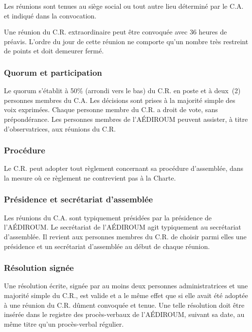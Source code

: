 \documentclass{aediroum}
\begin{document}
Les réunions sont tenues au siège social ou tout autre lieu déterminé par le C.A. et indiqué dans la convocation.

Une réunion du C.R. extraordinaire peut être convoquée avec 36 heures de préavis. L'ordre du jour de cette réunion ne comporte qu'un nombre très restreint de points et doit demeurer fermé.

\subsubsection{Quorum et participation}\label{sec:quorum-et-participation}

Le quorum s'établit à 50\% (arrondi vers le bas) du C.R. en poste et à deux~(2) personnes membres du C.A. Les décisions sont prises à la majorité simple des voix exprimées. Chaque personne membre du C.R. a droit de vote, sans prépondérance. Les personnes membres de l'AÉDIROUM peuvent assister, à titre d'observatrices, aux réunions du C.R.

\subsubsection{Procédure}\label{sec:procedure-admin}

Le C.R. peut adopter tout règlement concernant sa procédure d'assemblée, dans la mesure où ce règlement ne contrevient pas à la Charte.

\subsubsection{Présidence et secrétariat d'assemblée}\label{sec:president-et-secretaire-dassemblee}

Les réunions du C.A. sont typiquement présidées par la présidence de l'AÉDIROUM. Le secrétariat de l'AÉDIROUM agit typiquement au secrétariat d’assemblée. Il revient aux personnes membres du C.R. de choisir parmi elles une présidence et un secrétariat d'assemblée au début de chaque réunion.

\subsubsection{Résolution signée}\label{sec:resolution-signee}

Une résolution écrite, signée par au moins deux personnes administratrices et une majorité simple du C.R., est valide et a le même effet que si elle avait été adoptée à une réunion du C.R. dûment convoquée et tenue. Une telle résolution doit être insérée dans le registre des procès-verbaux de l'AÉDIROUM, suivant sa date, au même titre qu'un procès-verbal régulier.
\end{document}
